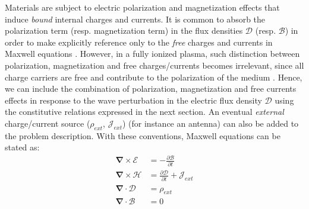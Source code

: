 Materials are subject to electric polarization and magnetization effects that induce \textit{bound} internal charges and currents. It is common to absorb the polarization term (resp. magnetization term) in the flux densities $\boldsymbol{\mathcal{D}}$ (resp. $\boldsymbol{\mathcal{B}}$) in order to make explicitly reference only to the \textit{free} charges and currents in Maxwell equations . However, in a fully ionized plasma, such distinction between polarization, magnetization and free charges/currents becomes irrelevant, since all charge carriers are free and contribute to the polarization of the medium . 
Hence, we can include the combination of polarization, magnetization and free currents effects in response to the wave perturbation in the electric flux density $\boldsymbol{\mathcal{D}}$ using the constitutive relations expressed in the next section. An eventual \textit{external} charge/current source ($\rho_{ext}$, $\boldsymbol{\mathcal{J}}_{ext}$) (for instance an antenna) can also be added to the problem description. With these conventions, Maxwell equations can be stated as:
\begin{subequations}
	\begin{align}
		\boldsymbol{\nabla} \times \boldsymbol{\mathcal{E}} &= -\frac{\partial \boldsymbol{\mathcal{B}}}{\partial t} \label{eq:Maxwell-Faraday}\\
		\boldsymbol{\nabla} \times \boldsymbol{\mathcal{H}} &= \frac{\partial \boldsymbol{\mathcal{D}}}{\partial t} + \boldsymbol{\mathcal{J}}_{ext} \label{eq:Maxwell-Ampere} \\
		\boldsymbol{\nabla} \cdot \boldsymbol{\mathcal{D}} &=  \rho_{ext} \label{eq:Maxwell-Gauss} \\
		\boldsymbol{\nabla} \cdot \boldsymbol{\mathcal{B}} &= 0 \label{eq:Maxwell-Gauss-Magnetism}
	\end{align}
	\label{eq:MaxwellEquations}
\end{subequations} 

